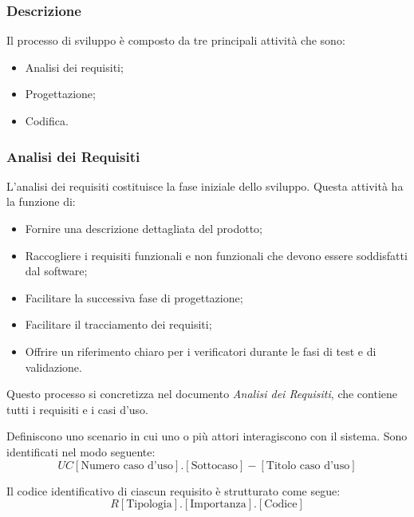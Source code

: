         \subsubsection{Descrizione}
        Il processo di sviluppo è composto da tre principali attività che sono:
        \begin{itemize}
            \item Analisi dei requisiti;
            \item Progettazione;
            \item Codifica.
        \end{itemize}


        \subsubsection{Analisi dei Requisiti}
        L'analisi dei requisiti costituisce la fase iniziale dello sviluppo.
        Questa attività ha la funzione di: 

        \begin{itemize}
            \item Fornire una descrizione dettagliata del prodotto;
            \item Raccogliere i requisiti funzionali e non funzionali che devono essere soddisfatti dal software;
            \item Facilitare la successiva fase di progettazione;
            \item Facilitare il tracciamento dei requisiti;
            \item Offrire un riferimento chiaro per i verificatori durante le fasi di test e di validazione.
        \end{itemize}

        Questo processo si concretizza nel documento \textit{Analisi dei Requisiti}, 
        che contiene tutti i requisiti e i casi d'uso.
        
        Definiscono uno scenario in cui uno o più attori interagiscono con il sistema. Sono
        identificati nel modo seguente:
        \textbf{
        \[
        UC[\text{Numero caso d'uso}].[\text{Sottocaso}] - [\text{Titolo caso d'uso}]
        \]
        }
        
         \vspace{1em}
         Il codice identificativo di ciascun requisito è strutturato come segue:
        \textbf{
        \[
        R[\text{Tipologia}].[ \text{Importanza}].[ \text{Codice}]
        \]
        }
        
